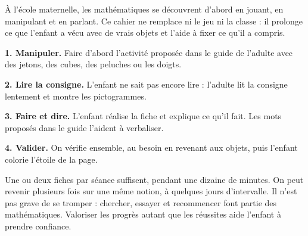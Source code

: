 \thispagestyle{matSimple}
{\fontsize{10.5}{15}\selectfont
À l’école maternelle, les mathématiques se découvrent d’abord en jouant, en
manipulant et en parlant. Ce cahier ne remplace ni le jeu ni la classe : il
prolonge ce que l’enfant a vécu avec de vrais objets et l’aide à fixer ce qu’il
a compris.\par\medskip
\begin{encadrevert}\matResume\end{encadrevert}\par\medskip
\begin{encadre}
\textbf{1. Manipuler.} Faire d’abord l’activité proposée dans le guide de l’adulte avec des jetons, des cubes, des peluches ou les doigts.\par\smallskip
\textbf{2. Lire la consigne.} L’enfant ne sait pas encore lire : l’adulte lit la consigne lentement et montre les pictogrammes.\par\smallskip
\textbf{3. Faire et dire.} L’enfant réalise la fiche et explique ce qu’il fait. Les mots proposés dans le guide l’aident à verbaliser.\par\smallskip
\textbf{4. Valider.} On vérifie ensemble, au besoin en revenant aux objets, puis l’enfant colorie l’étoile de la page.
\end{encadre}\par\medskip
\begin{encadre}
Une ou deux fiches par séance suffisent, pendant une dizaine de minutes. On peut revenir plusieurs fois sur une même notion, à quelques jours d’intervalle. Il n’est pas grave de se tromper : chercher, essayer et recommencer font partie des mathématiques. Valoriser les progrès autant que les réussites aide l’enfant à prendre confiance.
\end{encadre}\par}
\clearpage
\thispagestyle{matSimple}
